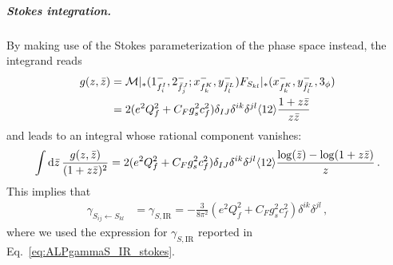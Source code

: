 \subparagraph{Stokes integration.}
By making use of the Stokes parameterization of the phase space instead, the integrand reads
\begin{align}
    g(z,\bar z) &=\mathcal M|_*(1_{f_i^I}^-,2_{\bar f_j^J}^-;x^{-}_{f_k^K},y^{-}_{\bar f_l^L})F_{S_{kl}}|_*(x^{-}_{f_k^K},y^{-}_{\bar f_l^L},3_\phi)
    \nonumber \\
    &=2 (e^2Q_f^2+C_Fg_s^2c_f^2)\delta_{IJ}\delta^{ik}\delta^{jl}\langle 1 2 \rangle \frac{1+z \bar z}{z \bar z}
\end{align}
and leads to an integral whose rational component vanishes:
\begin{equation}
    \int \text{d}\bar z \,\frac{g(z,\bar z)}{(1+z\bar z)^2} = 2 (e^2Q_f^2+C_Fg_s^2c_f^2)\delta_{IJ}\delta^{ik}\delta^{jl}\langle 1 2 \rangle \frac{\log(\bar z)-\log(1+z\bar z)}{z}\,.
\end{equation}
This implies that
\begin{align}
    \gamma_{S_{ij}\leftarrow S_{kl}}&= \gamma_{S,\text{IR}} = -\frac{3}{8\pi^2}(e^2Q_f^2+C_Fg_s^2c_f^2)\delta^{ik}\delta^{jl} \,,
\end{align}
where we used the expression for $\gamma_{S,\text{IR}}$ reported in
Eq.~\eqref{eq:ALPgammaS_IR_stokes}.

